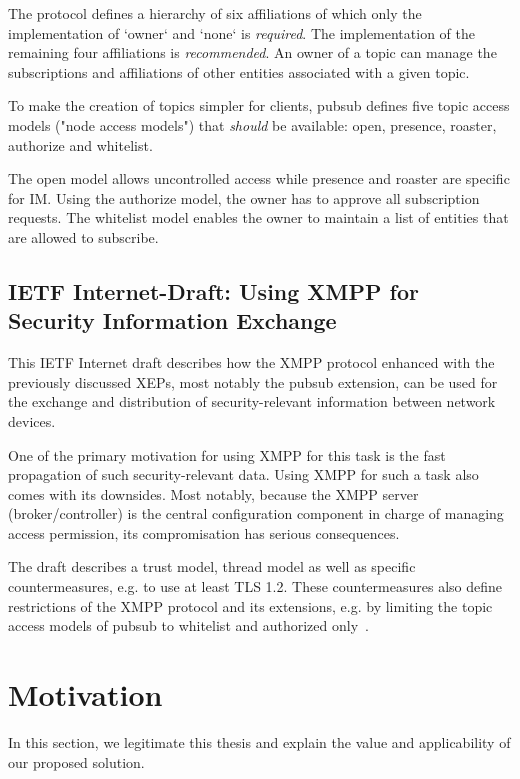 The protocol defines a hierarchy of six affiliations of which only the implementation of `owner` and `none` is \emph{required}.
The implementation of the remaining four affiliations is \emph{recommended}.
An owner of a topic can manage the subscriptions and affiliations of other entities associated with a given topic.

To make the creation of topics simpler for clients, \gls{pubsub} defines five topic access models ("node access models") that \emph{should} be available: open, presence, roaster, authorize and whitelist.

The open model allows uncontrolled access while presence and roaster are specific for IM. Using the authorize model, the owner has to approve all subscription requests. The whitelist model enables the owner to maintain a list of entities that are allowed to subscribe.

\subsection{IETF Internet-Draft: Using XMPP for Security Information Exchange}\label{sec:ietf-internet-draft-using-xmpp-for-security-information-exchange}
This IETF Internet draft describes how the XMPP protocol enhanced with the previously discussed XEPs, most notably the \gls{pubsub} extension, can be used for the exchange and distribution of security-relevant information between network devices.

One of the primary motivation for using XMPP for this task is the fast propagation of such security-relevant data.
Using XMPP for such a task also comes with its downsides. Most notably, because the XMPP server (\gls{broker}/\gls{controller}) is the central configuration component in charge of managing access permission, its compromisation has serious consequences.

The draft describes a trust model, thread model as well as specific countermeasures, e.g. to use at least TLS 1.2. These countermeasures also define restrictions of the XMPP protocol and its extensions, e.g. by limiting the topic access models of \gls{pubsub} to whitelist and authorized only~\cite{ietf-mile-xmpp-grid-05}.

\section{Motivation}
In this section, we legitimate this thesis and explain the value and applicability of our proposed solution.

